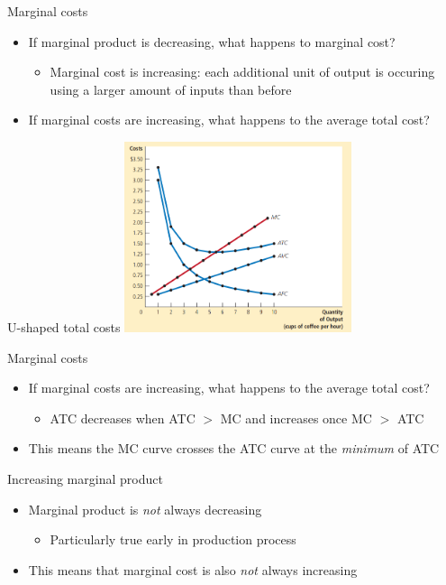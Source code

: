 \documentclass[aspectratio=169]{beamer}
\begin{document}
\begin{frame}{Marginal costs}
    \begin{itemize}
        \item If marginal product is decreasing, what happens to marginal cost?
            \begin{itemize}
                \item Marginal cost is increasing: each additional unit of output is occuring using a larger amount of inputs than before
            \end{itemize}
        \item If marginal costs are increasing, what happens to the average total cost?
    \end{itemize}
\end{frame}

\begin{frame}{U-shaped total costs}
    \centering
    \includegraphics[width = 0.5\textwidth,keepaspectratio]{uTC.png}
\end{frame}

\begin{frame}{Marginal costs}
    \begin{itemize}
        \item If marginal costs are increasing, what happens to the average total cost?
            \begin{itemize}
                \item ATC decreases when ATC $>$ MC and increases once MC $>$ ATC
            \end{itemize}
        \item This means the MC curve crosses the ATC curve at the \textit{minimum} of ATC
    \end{itemize}
\end{frame}

\begin{frame}{Increasing marginal product}
    \begin{itemize}
        \item Marginal product is \textit{not} always decreasing
            \begin{itemize}
                \item Particularly true early in production process
            \end{itemize}
        \item This means that marginal cost is also \textit{not} always increasing
    \end{itemize}
\end{frame}
\end{document}
